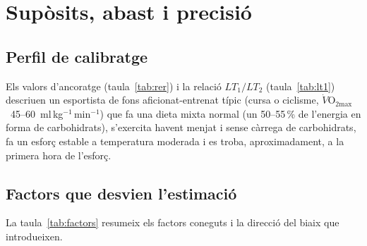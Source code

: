 \documentclass[10pt,a4paper]{article}
\newcommand{\VOmax}{\ensuremath{\dot V\mathrm{O_{2max}}}}
\newcommand{\mlkgmin}{ml\,kg$^{-1}$\,min$^{-1}$}
\begin{document}
\section{Supòsits, abast i precisió}\label{sec:suposits}

\subsection{Perfil de calibratge}
Els valors d'ancoratge (taula~\ref{tab:rer}) i la relació $LT_1/LT_2$
(taula~\ref{tab:lt1}) descriuen un esportista de fons aficionat-entrenat típic
(cursa o ciclisme, \VOmax\ 45--60~\mlkgmin) que fa una dieta mixta normal (un
50--55\,\% de l'energia en forma de carbohidrats), s'exercita havent menjat i sense
càrrega de carbohidrats, fa un esforç estable a temperatura moderada i es troba,
aproximadament, a la primera hora de l'esforç.

\subsection{Factors que desvien l'estimació}
La taula~\ref{tab:factors} resumeix els factors coneguts i la direcció del biaix
que introdueixen.
\end{document}

